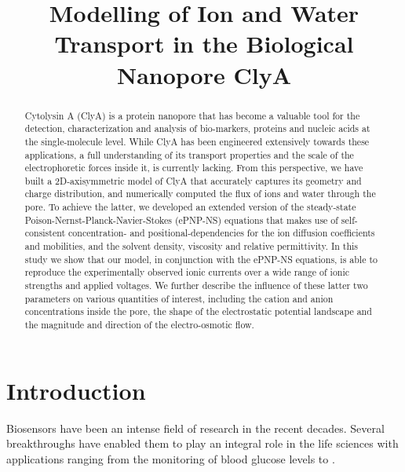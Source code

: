 \documentclass[journal=ancac3,manuscript=article,etalmode=truncate,maxauthors=0,layout=twocolumn]{achemso}
\title{Modelling of Ion and Water Transport in the Biological Nanopore ClyA}
\begin{document}

\begin{abstract}
\footnotesize
Cytolysin A (ClyA) is a protein nanopore that has become a valuable tool for the detection, characterization 
and analysis of bio-markers, proteins and nucleic acids at the single-molecule level.  While ClyA has been 
engineered extensively towards these applications, a full understanding of its transport properties and the 
scale of the electrophoretic forces inside it, is currently lacking. From this perspective, we have built a 
2D-axisymmetric model of ClyA that accurately captures its geometry and charge distribution, and numerically 
computed the flux of ions and water through the pore. To achieve the latter, we developed an extended version 
of the steady-state Poison-Nernst-Planck-Navier-Stokes (ePNP-NS) equations that makes use of self-consistent 
concentration- and positional-dependencies for the ion diffusion coefficients and mobilities, and the solvent 
density, viscosity and relative permittivity. In this study we show that our model, in conjunction with the 
ePNP-NS equations, is able to reproduce the experimentally observed ionic currents over a wide range of ionic 
strengths and applied voltages. We further describe the influence of these latter two parameters on various 
quantities of interest, including the cation and anion concentrations inside the pore, the shape of the 
electrostatic potential landscape and the magnitude and direction of the electro-osmotic flow.
\end{abstract}

\section{Introduction}

Biosensors have been an intense field of research in the recent decades\cite{Zhang-2016}. Several 
breakthroughs have enabled them to play an integral role in the life sciences with applications ranging from 
the monitoring of blood glucose levels\cite{Chen-2013} to .
\end{document}
